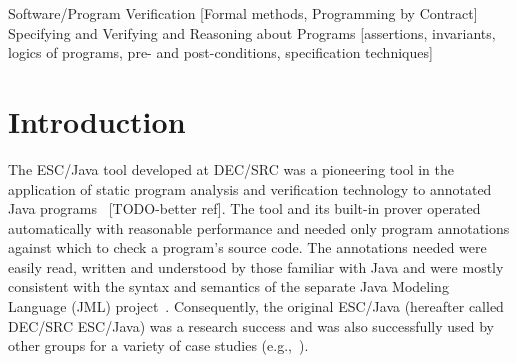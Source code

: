 \documentclass{acm_proc_article-sp}
\newif\ifpdf
\begin{document}
\newcommand{\myhref}[2]{\ifpdf\href{#1}{#2}\else\htmladdnormallinkfoot{#2}{#1}\fi}

\maketitle
\begin{abstract}
  The ESC/Java tool was a lauded advance in effective static checking
  of realistic Java programs, but has become out-of-date with respect
  to Java and the Java Modeling Language (JML).  The ESC/Java2
  project, whose progress is described in this paper, builds on the
  final release of ESC/Java from DEC/SRC in several ways.  It parses
  all of JML, thus can be used with the growing body of JML-annotated
  Java code; it has improved static checking capabilities, thus is
  becoming more complete and less unsound with each new release; and
  it has been designed, constructed, and documented in such a way as
  to improve the tool's availability to both users and researchers.
  It is intended that ESC/Java2 be used for further research in
  annotation and verification, for larger-scale case studies of
  annotation and verification, and for studies in programmer
  productivity that may result from integration with other tools that
  work with JML and Java.
\end{abstract}

                {Software/Program Verification}
                [Formal methods, Programming by Contract]
                {Specifying and Verifying and Reasoning about Programs}
                [assertions, invariants, logics of programs,
                pre- and post-conditions, specification techniques]




\section{Introduction}

The ESC/Java tool developed at DEC/SRC was a pioneering tool in the
application of static program analysis and verification technology to
annotated Java programs~\cite{ESCJava} [TODO-better ref].  The tool and its built-in
prover operated automatically with reasonable performance and needed
only program annotations against which to check a program's source
code.  The annotations needed were easily read, written and understood
by those familiar with Java and were mostly consistent with the syntax
and semantics of the separate Java Modeling Language (JML)
project~\cite{Leavens-etal00,jmlpapers}.  Consequently, the original
ESC/Java (hereafter called DEC/SRC ESC/Java) was a research success
and was also successfully used by other groups for a variety of case
studies (e.g.,~\cite{Hub03,HOP04}).
\end{document}
